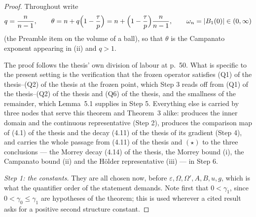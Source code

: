 \begin{proof}
Throughout write
\[
q=\frac n{n-1},\qquad
\theta=n+q\Bigl(1-\frac\tau p\Bigr)
=n+\Bigl(1-\frac\tau p\Bigr)\frac n{n-1},
\qquad
\omega_n=|B_1(0)|\in(0,\infty)
\]
(the Preamble item on the volume of a ball), so that $\theta$ is the Campanato
exponent appearing in (ii) and $q>1$.

The proof follows the thesis' own division of labour at p.~50.  What is
specific to the present setting is the verification that the frozen operator
satisfies (Q1) of the thesis--(Q2) of the thesis at the frozen point, which Step 3 reads
off from (Q1) of the thesis--(Q2) of the thesis and (Q6) of the thesis, and the smallness of
the remainder, which Lemma~5.1 supplies in Step 5.  Everything else is carried
by three nodes that serve this theorem and Theorem~3 alike:
 produces the inner domain and the
continuous representative (Step 2),  produces
the comparison map of (4.1) of the thesis and the decay (4.11) of the thesis of its
gradient (Step 4), and  carries the whole
passage from (4.11) of the thesis and $(\star)$ to the three conclusions --- the
Morrey decay (4.14) of the thesis, the Morrey bound (i), the Campanato bound (ii)
and the H\"older representative (iii) --- in Step 6.

\emph{Step 1: the constants.}  They are all chosen now, before
$\varepsilon,\Omega,\Omega',A,B,u,g$, which is what the quantifier order of the
statement demands.  Note first that $0<\gamma_1$, since $0<\gamma_0\le\gamma_1$
are hypotheses of the theorem; this is used wherever a cited result asks for a
positive second structure constant.


\end{proof}
